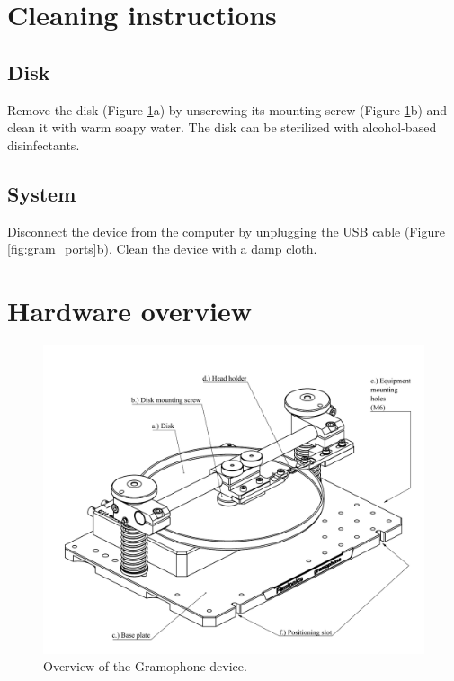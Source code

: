 \documentclass[11pt,a4paper]{article}
\newcommand{\enote}[1]{\textcolor{RubineRed}{#1}}
\begin{document}
\section{Cleaning instructions}
\subsection{Disk}
Remove the disk (Figure \ref{fig:gram_overview}a) by unscrewing its mounting screw (Figure \ref{fig:gram_overview}b) and clean it with warm soapy water. The disk can be sterilized with alcohol-based disinfectants.

\subsection{System}
Disconnect the device from the computer by unplugging the USB cable (Figure \ref{fig:gram_ports}b). Clean the device with a damp cloth.

\newpage
\section{Hardware overview}
\begin{figure}[h] %
\centering
\includegraphics[clip, trim=1cm 0cm 0cm 1cm, width=1.00\textwidth]{labels_overview.PDF}
\caption{Overview of the Gramophone device.}
\label{fig:gram_overview}
\end{figure}
\end{document}

